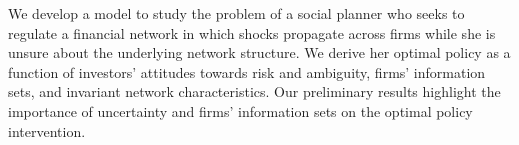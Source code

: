 We develop a model to study the problem of a social planner who seeks to regulate a financial network in which shocks propagate across firms while she is unsure about the underlying network structure. We derive her optimal policy as a function of investors' attitudes towards risk and ambiguity, firms' information sets, and invariant network characteristics. Our preliminary results highlight the importance of uncertainty and firms' information sets on the optimal policy intervention.